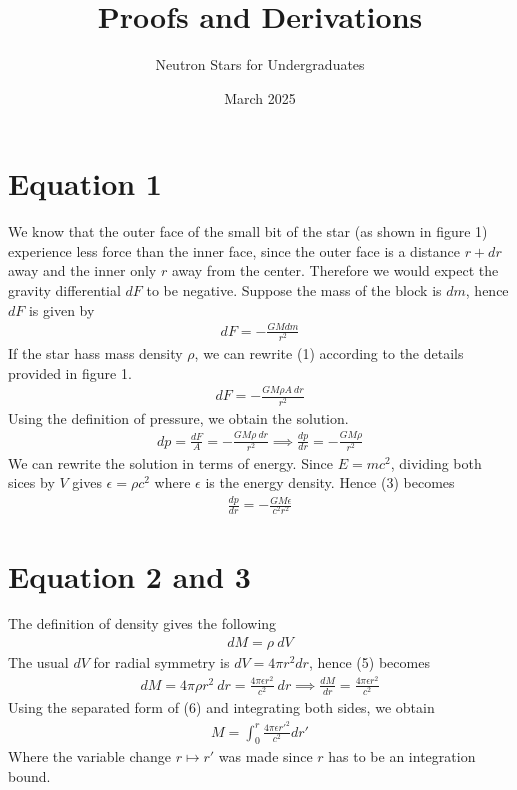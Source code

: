 \documentclass{article}
\title{Proofs and Derivations}
\author{Neutron Stars for Undergraduates}
\date{March 2025}
\begin{document}
\maketitle
\section*{Equation 1}
We know that the outer face of the small bit of the star (as shown in figure 1) experience less 
force than the inner face, since the outer face is a distance $r+dr$ away and
 the inner only $r$ away from the center. Therefore we would expect the gravity differential $dF$ to be negative.  
Suppose the mass of the block is $dm$, hence $dF$ is given by
\begin{align}
    dF=-\frac{GMdm}{r^2}
\end{align}
If the star hass mass density $\rho$, we can rewrite (1) according to the details provided in figure 1.
\begin{align}
    dF=-\frac{GM\rho A \ dr}{r^2}
\end{align}
Using the definition of pressure, we obtain the solution. 
\begin{align}
    dp=\frac{dF}{A}=-\frac{GM\rho \ dr}{r^2}\implies \frac{dp}{dr}=-\frac{GM\rho}{r^2}
\end{align}
We can rewrite the solution in terms of energy. Since $E=mc^2$, dividing both sices by $V$ gives 
$\epsilon=\rho c^2$ where $\epsilon$ is the energy density. Hence (3) becomes 
\begin{align}
    \boxed{\frac{dp}{dr}=-\frac{GM\epsilon}{c^2r^2}}
\end{align}
\section*{Equation 2 and 3}
The definition of density gives the following 
\begin{align}
    dM=\rho\ dV
\end{align}
The usual $dV$ for radial symmetry is $dV=4\pi r^2 dr$, hence (5) becomes 
\begin{align}
    dM=4\pi\rho r^2\ dr=\frac{4\pi\epsilon r^2}{c^2}\ dr\implies \boxed{\frac{dM}{dr}=\frac{4\pi\epsilon r^2}{c^2}}
\end{align}
Using the separated form of (6) and integrating both sides, we obtain 
\begin{align}
    M=\int_0^r\frac{4\pi\epsilon r'^2}{c^2}dr'
\end{align}
Where the variable change $r\mapsto r'$ was made since $r$ has to be an integration bound.
\end{document}
